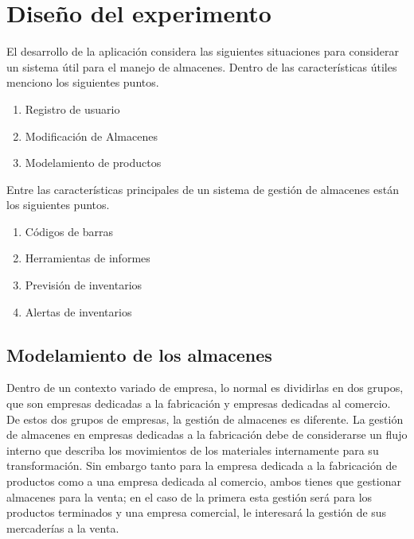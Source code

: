 

\chapter{Diseño del experimento}

El desarrollo de la aplicación considera las siguientes situaciones para considerar un sistema útil para el manejo de almacenes. Dentro de las características útiles menciono los siguientes puntos.

\begin{enumerate}
\item Registro de usuario
\item Modificación de Almacenes
\item Modelamiento de productos
\end{enumerate}

Entre las características principales de un sistema de gestión de almacenes están los siguientes puntos.

\begin{enumerate}
\item Códigos de barras
\item Herramientas de informes
\item Previsión de inventarios
\item Alertas de inventarios
\end{enumerate}

\section{Modelamiento de los almacenes}

Dentro de un contexto variado de empresa, lo normal es dividirlas en dos grupos, que son empresas dedicadas a la fabricación y empresas dedicadas al comercio. De estos dos grupos de empresas, la gestión de almacenes es diferente. La gestión de almacenes en empresas dedicadas a la fabricación debe de considerarse un flujo interno que describa los movimientos de los materiales internamente para su transformación. Sin embargo tanto para la empresa dedicada a la fabricación de productos como a una empresa dedicada al comercio, ambos tienes que gestionar almacenes para la venta; en el caso de la primera esta gestión será para los productos terminados y una empresa comercial, le interesará la gestión de sus mercaderías a la venta.\\


